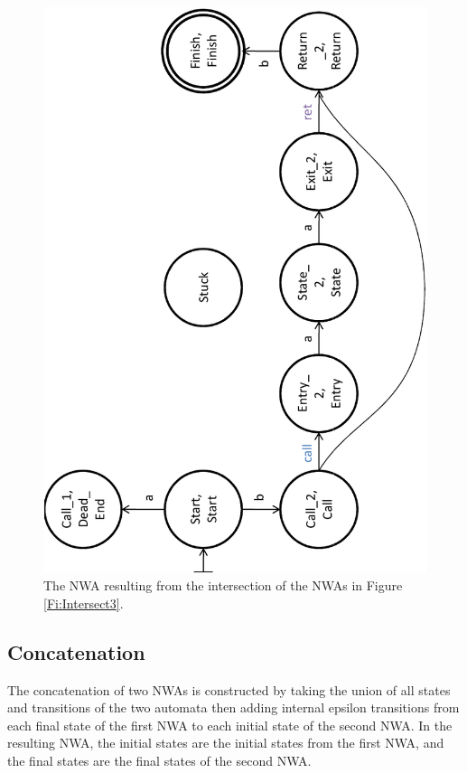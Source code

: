 \begin{figure}[p]
  \centering
    \includegraphics[width=12cm]{Figures/Figure8}
  \caption{The NWA resulting from the intersection of the NWAs in Figure \ref{Fi:Intersect3}.}
  \label{Fi:Intersect4}
\end{figure}



\subsection{Concatenation}
\label{Se:Concatenation}

The concatenation of two NWAs is constructed by taking the union of all
states and transitions of the two automata then adding
internal epsilon transitions from each final state of the first NWA to each
initial state of the second NWA.  In the resulting NWA, the initial states
are the initial states from the first NWA, and the final states are the final
states of the second NWA. %

